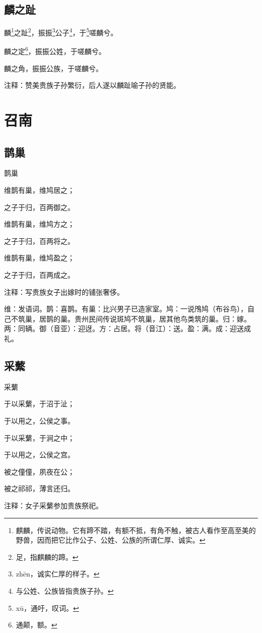 \documentclass[12pt,UTF8]{ctexbook}
\begin{document}
\chapter{麟之趾}

麟\footnote{麒麟，传说动物。它有蹄不踏，有额不抵，有角不触，被古人看作至高至美的野兽，因而把它比作公子、公姓、公族的所谓仁厚、诚实。}之趾\footnote{足，指麒麟的蹄。}，振振\footnote{zh\=en，诚实仁厚的样子。}公子\footnote{与公姓、公族皆指贵族子孙。}，于\footnote{x\=u，通吁，叹词。}嗟麟兮。

麟之定\footnote{通颠，额。}，振振公姓，于嗟麟兮。

麟之角，振振公族，于嗟麟兮。

注释：赞美贵族子孙繁衍，后人遂以麟趾喻子孙的贤能。





\part{召南}

\chapter{鹊巢}
鹊巢

维鹊有巢，维鸠居之；

之子于归，百两御之。

维鹊有巢，维鸠方之；

之子于归，百两将之。

维鹊有巢，维鸠盈之；

之子于归，百两成之。

注释：写贵族女子出嫁时的铺张奢侈。

维：发语词。鹊：喜鹊。有巢：比兴男子已造家室。鸠：一说鳲鸠（布谷鸟），自己不筑巢，居鹊的巢。贵州民间传说斑鸠不筑巢，居其他鸟类筑的巢。归：嫁。两：同辆。御（音亚）：迎迓。方：占居。将（音江）：送。盈：满。成：迎送成礼。
\chapter{采蘩}
采蘩

于以采蘩，于沼于沚；

于以用之，公侯之事。

于以采蘩，于涧之中；

于以用之，公侯之宫。

被之僮僮，夙夜在公；

被之祁祁，薄言还归。

注释：女子采蘩参加贵族祭祀。
\end{document}
